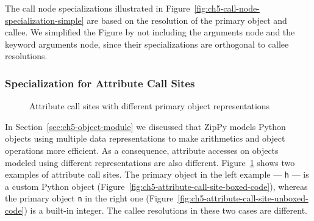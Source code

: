 The call node specializations illustrated in Figure~\ref{fig:ch5-call-node-specialization-simple} are based on the resolution of the primary object and callee.
We simplified the Figure by not including the arguments node and the keyword arguments node, since their specializations are orthogonal to callee resolutions.

\subsubsection{Specialization for Attribute Call Sites}

\begin{figure}
\centering
{}
\caption{Attribute call sites with different primary object representations}
\label{fig:ch5-attribute-call-site-boxed-unboxed-code}
\end{figure}

In Section~\ref{sec:ch5-object-module} we discussed that ZipPy models Python objects using multiple data representations to make arithmetics and object operations more efficient.
As a consequence, attribute accesses on objects modeled using different representations are also different.
Figure~\ref{fig:ch5-attribute-call-site-boxed-unboxed-code} shows two examples of attribute call sites.
The primary object in the left example --- \texttt{h} --- is a custom Python object (Figure~\ref{fig:ch5-attribute-call-site-boxed-code}),
whereas the primary object \texttt{n} in the right one (Figure~\ref{fig:ch5-attribute-call-site-unboxed-code}) is a built-in integer.
The callee resolutions in these two cases are different.

